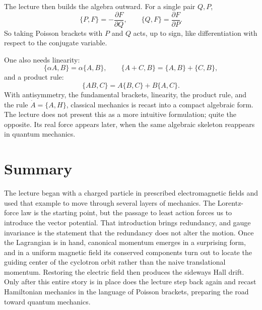 The lecture then builds the algebra outward. For a single pair \(Q,P\),
\begin{equation}
\{P,F\}=-\frac{\partial F}{\partial Q},
\qquad
\{Q,F\}=\frac{\partial F}{\partial P}.
\end{equation}
So taking Poisson brackets with \(P\) and \(Q\) acts, up to sign, like differentiation with respect to the conjugate variable.

One also needs linearity:
\begin{equation}
\{\alpha A,B\}=\alpha\{A,B\},
\qquad
\{A+C,B\}=\{A,B\}+\{C,B\},
\end{equation}
and a product rule:
\begin{equation}
\{AB,C\}=A\{B,C\}+B\{A,C\}.
\end{equation}
With antisymmetry, the fundamental brackets, linearity, the product rule, and the rule \(\dot A=\{A,H\}\), classical mechanics is recast into a compact algebraic form. The lecture does not present this as a more intuitive formulation; quite the opposite. Its real force appears later, when the same algebraic skeleton reappears in quantum mechanics.

\section{Summary}

The lecture began with a charged particle in prescribed electromagnetic fields and used that example to move through several layers of mechanics. The Lorentz-force law is the starting point, but the passage to least action forces us to introduce the vector potential. That introduction brings redundancy, and gauge invariance is the statement that the redundancy does not alter the motion. Once the Lagrangian is in hand, canonical momentum emerges in a surprising form, and in a uniform magnetic field its conserved components turn out to locate the guiding center of the cyclotron orbit rather than the naive translational momentum. Restoring the electric field then produces the sideways Hall drift. Only after this entire story is in place does the lecture step back again and recast Hamiltonian mechanics in the language of Poisson brackets, preparing the road toward quantum mechanics.